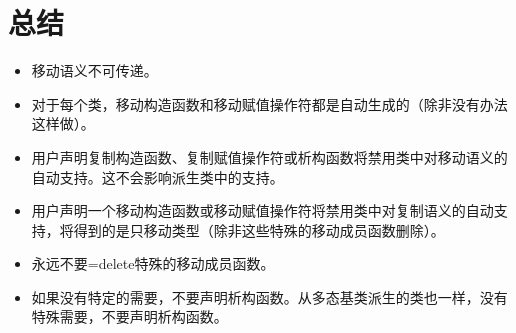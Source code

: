 \section{总结}
\begin{itemize}
	\item 移动语义不可传递。
	\item 对于每个类，移动构造函数和移动赋值操作符都是自动生成的（除非没有办法这样做）。
	\item 用户声明复制构造函数、复制赋值操作符或析构函数将禁用类中对移动语义的自动支持。这不会影响派生类中的支持。
	\item 用户声明一个移动构造函数或移动赋值操作符将禁用类中对复制语义的自动支持，将得到的是只移动类型（除非这些特殊的移动成员函数删除）。
	\item 永远不要=delete特殊的移动成员函数。
	\item 如果没有特定的需要，不要声明析构函数。从多态基类派生的类也一样，没有特殊需要，不要声明析构函数。
\end{itemize}


